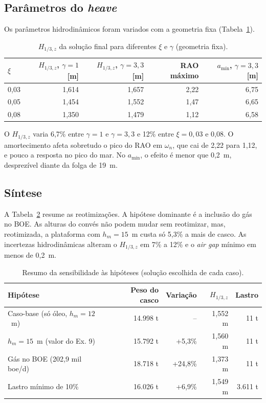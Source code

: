 \documentclass[11pt,a4paper]{article}
\newcommand{\Hz}{H_{1/3,z}}
\newcommand{\amin}{a_{\text{mín}}}
\begin{document}
\subsection{Parâmetros do \emph{heave}}

Os parâmetros hidrodinâmicos foram variados com a geometria fixa (Tabela~\ref{tab:sensheave}).

\begin{table}[!htb]
\centering
\caption{$\Hz$ da solução final para diferentes $\xi$ e $\gamma$ (geometria fixa).}\label{tab:sensheave}
\begin{tabular}{lrrrr}
\toprule
$\xi$ & $\Hz$, $\gamma = 1$ [m] & $\Hz$, $\gamma = 3{,}3$ [m] & RAO máximo & $\amin$, $\gamma = 3{,}3$ [m] \\
\midrule
0,03 & 1,614 & 1,657 & 2,22 & 6,75 \\
0,05 & 1,454 & 1,552 & 1,47 & 6,65 \\
0,08 & 1,350 & 1,479 & 1,12 & 6,58 \\
\bottomrule
\end{tabular}
\end{table}

O $\Hz$ varia 6,7\% entre $\gamma = 1$ e $\gamma = 3{,}3$ e 12\% entre $\xi = 0{,}03$ e 0,08. O
amortecimento afeta sobretudo o pico do RAO em $\omega_n$, que cai de 2,22 para 1,12, e pouco a
resposta no pico do mar. No $\amin$, o efeito é menor que 0,2~m, desprezível diante da folga de
19~m.

\subsection{Síntese}

A Tabela~\ref{tab:sensresumo} resume as reotimizações. A hipótese dominante é a inclusão do gás no
BOE. As alturas do convés não podem mudar sem reotimizar, mas, reotimizada, a plataforma com
$h_m = 15$~m custa só 5,3\% a mais de casco. As incertezas hidrodinâmicas alteram o $\Hz$ em 7\% a
12\% e o \emph{air gap} mínimo em menos de 0,2~m.

\begin{table}[!htb]
\centering
\caption[Resumo da sensibilidade às hipóteses]{Resumo da sensibilidade às hipóteses (solução
escolhida de cada caso).}\label{tab:sensresumo}
\small
\begin{tabular}{lrrrr}
\toprule
Hipótese & Peso do casco & Variação & $\Hz$ & Lastro \\
\midrule
Caso-base (só óleo, $h_m = 12$~m) & 14.998 t & -- & 1,552 m & 11 t \\
$h_m = 15$~m (valor do Ex. 9) & 15.792 t & +5,3\% & 1,560 m & 11 t \\
Gás no BOE (202,9 mil boe/d) & 18.718 t & +24,8\% & 1,373 m & 11 t \\
Lastro mínimo de 10\% & 16.026 t & +6,9\% & 1,549 m & 3.611 t \\
\bottomrule
\end{tabular}
\end{table}
\end{document}
